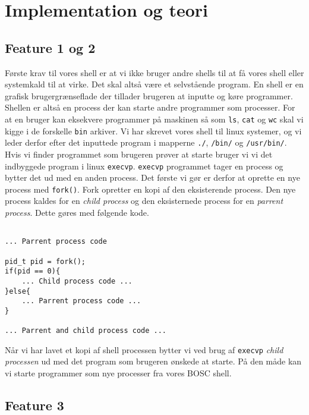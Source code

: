 \documentclass[danish]{report}
\begin{document}
\chapter{Implementation og teori}
\section{Feature 1 og 2}
Første krav til vores shell er at vi ikke bruger andre shells til at få vores shell eller systemkald til at virke. Det skal altså være et selvstående program. En shell er en grafisk brugergrænseflade der tillader brugeren at inputte og køre programmer. Shellen er altså en process der kan starte andre programmer som processer. For at en bruger kan eksekvere programmer på maskinen så som {\tt ls}, {\tt cat} og {\tt wc} skal vi kigge i de forskelle {\tt bin} arkiver. Vi har skrevet vores shell til linux systemer, og vi leder derfor efter det inputtede program i mapperne {\tt ./}, {\tt /bin/} og {\tt /usr/bin/}. Hvis vi finder programmet som brugeren prøver at starte bruger vi vi det indbyggede program i linux {\tt execvp}. {\tt execvp} programmet tager en process og bytter det ud med en anden process. Det første vi gør er derfor at oprette en nye process med {\tt fork()}. Fork opretter en kopi af den eksisterende process. Den nye process kaldes for en \textit{child process} og den eksisternede process for en \textit{parrent process}. Dette gøres med følgende kode.

\begin{lstlisting}

... Parrent process code

pid_t pid = fork();
if(pid == 0){
    ... Child process code ...
}else{
    ... Parrent process code ...
}

... Parrent and child process code ...

\end{lstlisting}

Når vi har lavet et kopi af shell processen bytter vi ved brug af {\tt execvp} \textit{child processen} ud med det program som brugeren ønskede at starte. På den måde kan vi starte programmer som nye processer fra vores BOSC shell.

\section{Feature 3}
\end{document}
